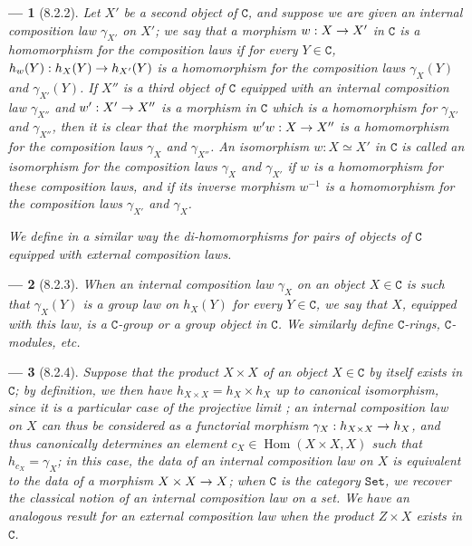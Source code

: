 \documentclass[oneside]{amsart}
\theoremstyle{ega-env-style}
\newtheorem*{env}{---}
\theoremstyle{ega-thm-env-style}
\theoremstyle{ega-defn-env-style}
\def\cat{\mathtt}                   %
\def\C{\cat{C}}                     %
\def\Set{\cat{Set}}                 %
\def\Hom{\operatorname{Hom}}
\renewcommand{\to}{\mathchoice{\longrightarrow}{\rightarrow}{\rightarrow}{\rightarrow}}
\def\isoto{\simeq} %
\newcommand{\oldpage}[2][]{{\marginnote{\normalfont{\textbf{#1}~|~#2}}}\ignorespaces}
\let\EGAOriginalLabel\label
\renewcommand{\label}[1]{\phantomsection\EGAOriginalLabel{#1}}
\begin{document}
\begin{env}[8.2.2]
\label{0.8.2.2}
Let $X'$ be a second object of $\C$, and suppose we are given an internal composition law $\gamma_{X'}$ on $X'$; we say that a morphism $w:X\to X'$ in $\C$ is a \emph{homomorphism} for the composition laws if for every $Y\in\C$, $h_w(Y):h_X(Y)\to h_{X'}(Y)$ is a \emph{homomorphism} for the composition laws $\gamma_X(Y)$ and $\gamma_{X'}(Y)$.
If $X''$ is a third
\oldpage[0\textsubscript{III}]{10}
object of $\C$ equipped with an internal composition law $\gamma_{X''}$ and $w':X'\to X''$ is a morphism in $\C$ which is a homomorphism for $\gamma_{X'}$ and $\gamma_{X''}$, then it is clear that the morphism $w'w:X\to X''$ is a homomorphism for the composition laws $\gamma_X$ and $\gamma_{X''}$.
An isomorphism $w:X\isoto X'$ in $\C$ is called an \emph{isomorphism for the composition laws $\gamma_X$ and $\gamma_{X'}$} if $w$ is a homomorphism for these composition laws, and if its inverse morphism $w^{-1}$ is a homomorphism for the composition laws $\gamma_{X'}$ and $\gamma_X$.

We define in a similar way the \emph{di-homomorphisms} for pairs of objects of $\C$ equipped with external composition laws.
\end{env}

\begin{env}[8.2.3]
\label{0.8.2.3}
When an internal composition law $\gamma_X$ on an object $X\in\C$ is such that $\gamma_X(Y)$ is a \emph{group law} on $h_X(Y)$ for \emph{every} $Y\in\C$, we say that $X$, equipped with this law, is a \emph{$\C$-group} or a \emph{group object in $\C$}.
We similarly define \emph{$\C$-rings}, \emph{$\C$-modules}, etc.
\end{env}

\begin{env}[8.2.4]
\label{0.8.2.4}
Suppose that the \emph{product} $X\times X$ of an object $X\in\C$ by itself exists in $\C$; by definition, we then have $h_{X\times X}=h_X\times h_X$ up to canonical isomorphism, since it is a particular case of the projective limit ; an internal composition law on $X$ can thus be considered as a functorial morphism $\gamma_X:h_{X\times X}\to h_X$, and thus canonically determines  an element $c_X\in\Hom(X\times X,X)$ such that $h_{c_X}=\gamma_X$; in this case, the data of an internal composition law on $X$ is equivalent to the data of a morphism $X\times X\to X$; when $\C$ is the category $\Set$, we recover the classical notion of an internal composition law on a set.
We have an analogous result for an external composition law when the product $Z\times X$ exists in $\C$.
\end{env}
\end{document}
